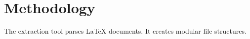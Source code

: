\section{Methodology}
The extraction tool parses LaTeX documents.
It creates modular file structures.